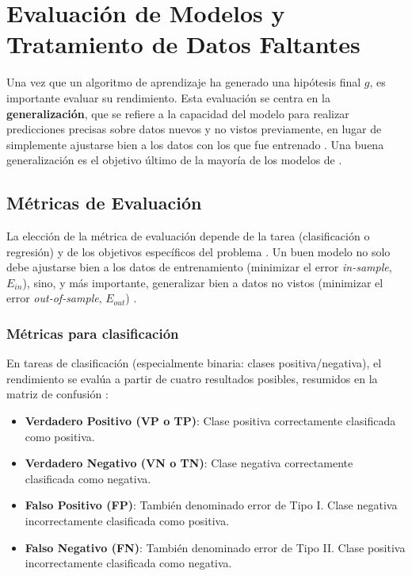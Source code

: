 \section{Evaluación de Modelos y Tratamiento de Datos Faltantes}
\label{sec:EvaluacionImputacion}
Una vez que un algoritmo de aprendizaje ha generado una hipótesis final $g$, es importante evaluar su rendimiento. Esta evaluación se centra en la \textbf{generalización}, que se refiere a la capacidad del modelo para realizar predicciones precisas sobre datos nuevos y no vistos previamente, en lugar de simplemente ajustarse bien a los datos con los que fue entrenado \citep{Goodfellow2016}. Una buena generalización es el objetivo último de la mayoría de los modelos de  . 

\subsection{Métricas de Evaluación}
\label{subsec:Metricas}
La elección de la métrica de evaluación depende de la tarea (clasificación o regresión) y de los objetivos específicos del problema \citep{Bishop2006}. Un buen modelo no solo debe ajustarse bien a los datos de entrenamiento (minimizar el error \textit{in-sample}, $E_{in}$), sino, y más importante, generalizar bien a datos no vistos (minimizar el error \textit{out-of-sample}, $E_{out}$) \citep{abu-mostafa_learning_2012}.

\subsubsection*{Métricas para clasificación}

En tareas de clasificación (especialmente binaria: clases positiva/negativa), el rendimiento se evalúa a partir de cuatro resultados posibles, resumidos en la matriz de confusión \citep{Fawcett2006}:
\begin{itemize}
    \item \textbf{Verdadero Positivo (VP o TP)}: Clase positiva correctamente clasificada como positiva.
    \item \textbf{Verdadero Negativo (VN o TN)}: Clase negativa correctamente clasificada como negativa.
    \item \textbf{Falso Positivo (FP)}: También denominado error de Tipo I. Clase negativa incorrectamente clasificada como positiva.
    \item \textbf{Falso Negativo (FN)}: También denominado error de Tipo II. Clase positiva incorrectamente clasificada como negativa.
\end{itemize}

